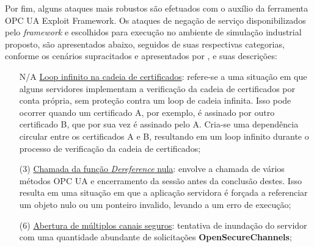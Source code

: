     Por fim, alguns ataques mais robustos são efetuados com o auxílio da ferramenta OPC UA Exploit Framework. Os ataques de negação de serviço disponibilizados pelo \textit{framework} e escolhidos para execução no ambiente de simulação industrial proposto, são apresentados abaixo, seguidos de suas respectivas categorias, conforme os cenários supracitados e apresentados por , e suas descrições:

    \begin{itemize}
        \item[N/A] \underline{Loop infinito na cadeia de certificados}: refere-se a uma situação em que alguns servidores implementam a verificação da cadeia de certificados por conta própria, sem proteção contra um loop de cadeia infinita. Isso pode ocorrer quando um certificado A, por exemplo, é assinado por outro certificado B, que por sua vez é assinado pelo A. Cria-se uma dependência circular entre os certificados A e B, resultando em um loop infinito durante o processo de verificação da cadeia de certificados;
        \item[(3)] \underline{Chamada da função \textit{Dereference} nula}: envolve a chamada de vários métodos OPC UA e encerramento da sessão antes da conclusão destes. Isso resulta em uma situação em que a aplicação servidora é forçada a referenciar um objeto nulo ou um ponteiro invalido, levando a um erro de execução;
        \item[(6)] \underline{Abertura de múltiplos canais seguros}: tentativa de inundação do servidor com uma quantidade abundante de solicitações \textbf{OpenSecureChannels};

\end{itemize}
